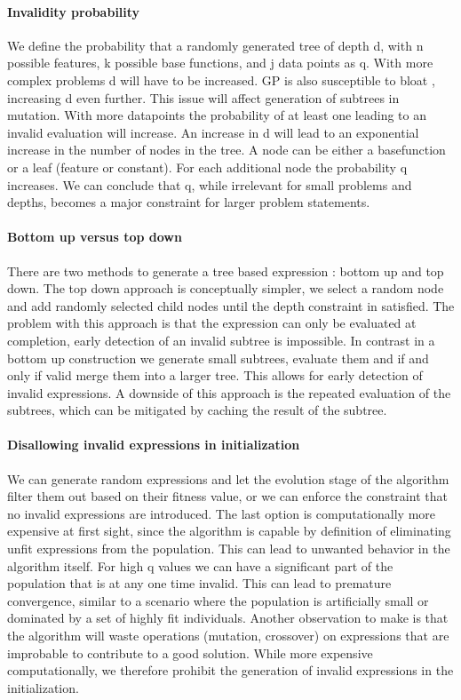 \paragraph{Invalidity probability}
We define the probability that a randomly generated tree of depth d, with n possible features, k possible base functions, and j data points as q. With more complex problems d will have to be increased. GP is also susceptible to bloat \cite{GPBloat}, increasing d even further. This issue will affect generation of subtrees in mutation. With more datapoints the probability of at least one leading to an invalid evaluation will increase. An increase in d will lead to an exponential increase in the number of nodes in the tree. A node can be either a basefunction or a leaf (feature or constant). For each additional node the probability q increases. We can conclude that q, while irrelevant for small problems and depths, becomes a major constraint for larger problem statements. 

\paragraph{Bottom up versus top down}
There are two methods to generate a tree based expression : bottom up and top down. The top down approach is conceptually simpler, we select a random node and add randomly selected child nodes until the depth constraint in satisfied. The problem with this approach is that the expression can only be evaluated at completion, early detection of an invalid subtree is impossible. 
In contrast in a bottom up construction we generate small subtrees, evaluate them and if and only if valid merge them into a larger tree. This allows for early detection of invalid expressions. A downside of this approach is the repeated evaluation of the subtrees, which can be mitigated by caching the result of the subtree.

\paragraph{Disallowing invalid expressions in initialization}
We can generate random expressions and let the evolution stage of the algorithm filter them out based on their fitness value, or we can enforce the constraint that no invalid expressions are introduced. The last option is computationally more expensive at first sight, since the algorithm is capable by definition of eliminating unfit expressions from the population. 
This can lead to unwanted behavior in the algorithm itself. For high q values we can have a significant part of the population that is at any one time invalid. This can lead to premature convergence, similar to a scenario where the population is artificially small or dominated by a set of highly fit individuals. Another observation to make is that the algorithm will waste operations (mutation, crossover) on expressions that are improbable to contribute to a good solution. 
While more expensive computationally, we therefore prohibit the generation of invalid expressions in the initialization. 

